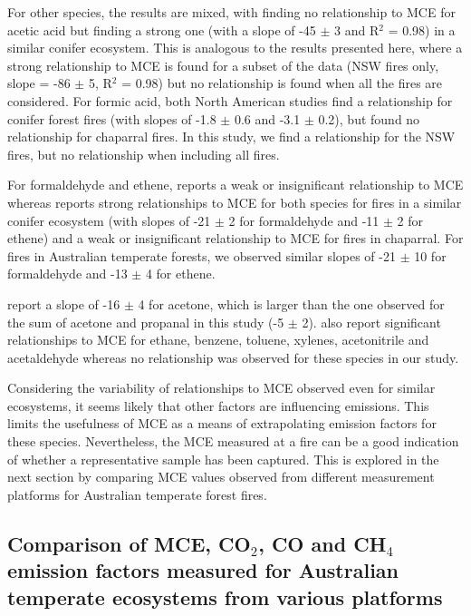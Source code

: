 \documentclass[acp, manuscript]{copernicus}
\begin{document}
For other species, the results are mixed, with \citet{Akagi2013} finding no relationship to MCE for acetic acid but \citet{Burling2011} finding a strong one (with a slope of -45 $\pm$ 3 and R$^2$ = 0.98) in a similar conifer ecosystem. This is analogous to the results presented here, where a strong relationship to MCE is found for a subset of the data (NSW fires only, slope = -86 $\pm$ 5, R$^2$ = 0.98) but no relationship is found when all the fires are considered. 
For formic acid, both North American studies find a relationship for conifer forest fires (with slopes of -1.8 $\pm$ 0.6 and -3.1 $\pm$ 0.2), but \citet{Burling2011} found no relationship for chaparral fires. In this study, we find a relationship for the NSW fires, but no relationship when including all fires. 

For formaldehyde and ethene, \citet{Akagi2013} reports a weak or insignificant relationship to MCE whereas \citet{Burling2011} reports strong relationships to MCE for both species for fires in a similar conifer ecosystem (with slopes of -21 $\pm$ 2 for formaldehyde and -11 $\pm$ 2 for ethene) and a weak or insignificant relationship to MCE for fires in chaparral. For fires in Australian temperate forests, we observed similar slopes of -21 $\pm$ 10 for formaldehyde and -13 $\pm$ 4 for ethene. 

\citet{Akagi2013} report a slope of -16 $\pm$ 4 for acetone, which is larger than the one observed for the sum of acetone and propanal in this study (-5 $\pm$ 2). \citet{Akagi2013} also report significant relationships to MCE for ethane, benzene, toluene, xylenes, acetonitrile and acetaldehyde whereas no relationship was observed for these species in our study.
   
Considering the variability of relationships to MCE observed even for similar ecosystems, it seems likely that other factors are influencing emissions.%
This limits the usefulness of MCE as a means of extrapolating emission factors for these species. Nevertheless, the MCE measured at a fire can be a good indication of whether a representative sample has been captured. This is explored in the next section by comparing MCE values observed from different measurement platforms for Australian temperate forest fires. 

\subsection{Comparison of MCE, CO$_2$, CO and CH$_4$ emission factors measured for Australian temperate ecosystems from various platforms}
\end{document}
